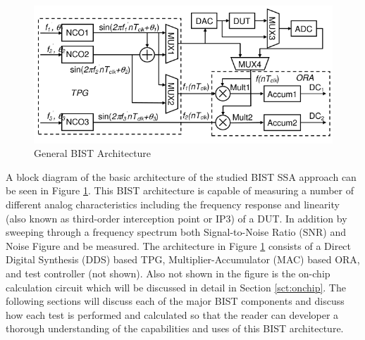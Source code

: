 \documentclass[12pt]{report}
\begin{document}
\begin{figure}
	\begin{center}
		\includegraphics[scale=.5]{images/bist-ssa-architecture}
	\end{center}
	\caption{General BIST Architecture\cite{testtime}}
	\label{fig:bist-ssa}
\end{figure}
A block diagram of the basic architecture of the studied BIST SSA approach can be seen in Figure \ref{fig:bist-ssa}.  This BIST architecture is capable of measuring a number of different analog characteristics including the frequency response and linearity (also known as third-order interception point or IP3) of a DUT\cite{basessa}.  In addition by sweeping through a frequency spectrum both Signal-to-Noise Ratio (SNR) and Noise Figure\cite{noisefigure} and be measured.  The architecture in Figure \ref{fig:bist-ssa} consists of a Direct Digital Synthesis (DDS) based TPG, Multiplier-Accumulator (MAC) based ORA, and test controller (not shown).  Also not shown in the figure is the on-chip calculation circuit which will be discussed in detail in Section \ref{sct:onchip}.  The following sections will discuss each of the major BIST components and discuss how each test is performed and calculated so that the reader can developer a thorough understanding of the capabilities and uses of this BIST architecture.
\end{document}
